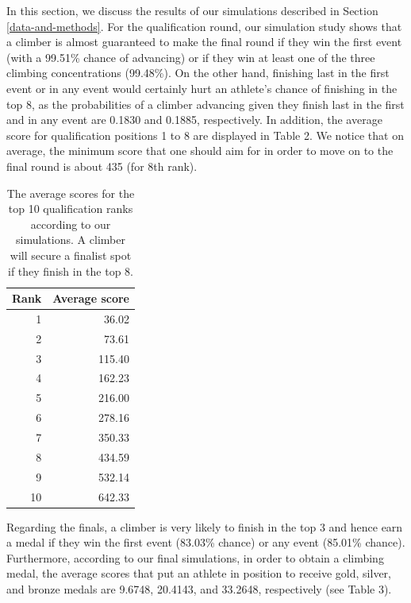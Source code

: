 \documentclass[12pt]{article}
\begin{document}
In this section, we discuss the results of our simulations described in
Section \ref{data-and-methods}. For the qualification round, our
simulation study shows that a climber is almost guaranteed to make the
final round if they win the first event (with a 99.51\% chance of
advancing) or if they win at least one of the three climbing
concentrations (99.48\%). On the other hand, finishing last in the first
event or in any event would certainly hurt an athlete's chance of
finishing in the top 8, as the probabilities of a climber advancing
given they finish last in the first and in any event are 0.1830 and
0.1885, respectively. In addition, the average score for qualification
positions 1 to 8 are displayed in Table 2. We notice that on average,
the minimum score that one should aim for in order to move on to the
final round is about 435 (for 8th rank).

\begin{table}[ht]
\centering
\caption{The average scores for the top 10 qualification ranks according to our simulations. A climber will secure a finalist spot if they finish in the top 8.} 
\begin{tabular}{rr}
  \hline
Rank & Average score \\ 
  \hline
  1 & 36.02 \\ 
    2 & 73.61 \\ 
    3 & 115.40 \\ 
    4 & 162.23 \\ 
    5 & 216.00 \\ 
    6 & 278.16 \\ 
    7 & 350.33 \\ 
    8 & 434.59 \\ 
    9 & 532.14 \\ 
   10 & 642.33 \\ 
   \hline
\end{tabular}
\end{table}

Regarding the finals, a climber is very likely to finish in the top 3
and hence earn a medal if they win the first event (83.03\% chance) or
any event (85.01\% chance). Furthermore, according to our final
simulations, in order to obtain a climbing medal, the average scores
that put an athlete in position to receive gold, silver, and bronze
medals are 9.6748, 20.4143, and 33.2648, respectively (see Table 3).
\end{document}
